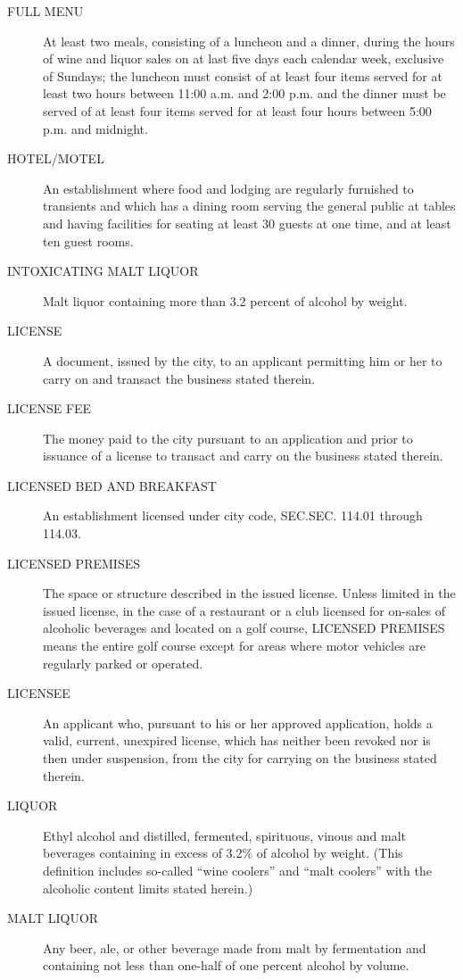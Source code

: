 \begin{description}
    \item[FULL MENU] At least two meals, consisting of a luncheon and a dinner, during the hours of wine and liquor sales on at last five days each calendar week, exclusive of Sundays; the luncheon must consist of at least four items served for at least two hours between 11:00 a.m. and 2:00 p.m. and the dinner must be served of at least four items served for at least four hours between 5:00 p.m. and midnight.
    \item[HOTEL/MOTEL] An establishment where food and lodging are regularly furnished to transients and which has a dining room serving the general public at tables and having facilities for seating at least 30 guests at one time, and at least ten guest rooms.
    \item[INTOXICATING MALT LIQUOR] Malt liquor containing more than 3.2 percent of alcohol by weight.
    \item[LICENSE] A document, issued by the city, to an applicant permitting him or her to carry on and transact the business stated therein.
    \item[LICENSE FEE] The money paid to the city pursuant to an application and prior to issuance of a license to transact and carry on the business stated therein.
    \item[LICENSED BED AND BREAKFAST] An establishment licensed under city code, SEC.SEC. 114.01 through 114.03.
    \item[LICENSED PREMISES] The space or structure described in the issued license.  Unless limited in the issued license, in the case of a restaurant or a club licensed for on-sales of alcoholic beverages and located on a golf course, LICENSED PREMISES means the entire golf course except for areas where motor vehicles are regularly parked or operated.
    \item[LICENSEE] An applicant who, pursuant to his or her approved application, holds a valid, current, unexpired license, which has neither been revoked nor is then under suspension, from the city for carrying on the business stated therein.
    \item[LIQUOR] Ethyl alcohol and distilled, fermented, spirituous, vinous and malt beverages containing in excess of 3.2\% of alcohol by weight. (This definition includes so-called “wine coolers” and “malt coolers” with the alcoholic content limits stated herein.)
    \item[MALT LIQUOR] Any beer, ale, or other beverage made from malt by fermentation and containing not less than one-half of one percent alcohol by volume.

\end{description}
